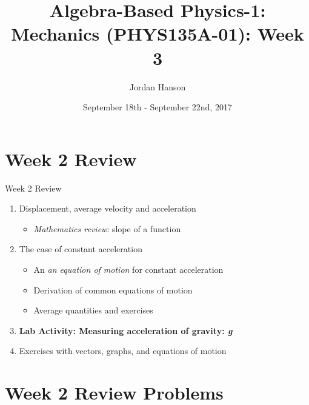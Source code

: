 \documentclass{beamer}
\title{Algebra-Based Physics-1: Mechanics (PHYS135A-01): Week 3}
\date{September 18th - September 22nd, 2017}
\author{Jordan Hanson}
\institute{Whittier College Department of Physics and Astronomy}
\begin{document}
\maketitle

\section{Week 2 Review}

\begin{frame}{Week 2 Review}
\begin{enumerate}
\item Displacement, average velocity and acceleration
\begin{itemize}
\item \textit{Mathematics review}: slope of a function
\end{itemize}
\item The case of constant acceleration
\begin{itemize}
\item An \textit{an equation of motion} for constant acceleration
\item Derivation of \alert{common equations of motion}
\item Average quantities and exercises
\end{itemize}
\item \textbf{Lab Activity: Measuring acceleration of gravity: \textit{g}}
\item Exercises with vectors, graphs, and equations of motion
\end{enumerate}
\end{frame}

\section{Week 2 Review Problems}
\end{document}
